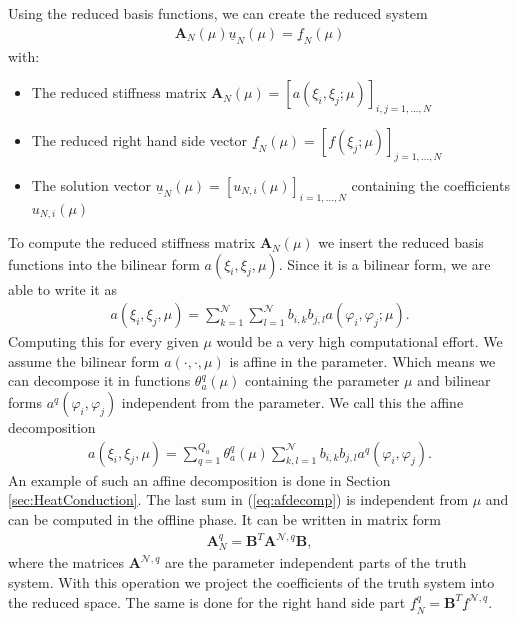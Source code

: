 Using the reduced basis functions, we can create the reduced system
\begin{align*}
\mathbf{A}_N (\mu) \underline{u}_N (\mu) = \underline{f}_N(\mu)
\end{align*}
with:
\begin{itemize}
	\item The reduced stiffness matrix $\mathbf{A}_N (\mu) = [a( \xi_i , \xi_j  ; \mu )]_{i,j=1,...,N}$
	\item The reduced right hand side vector $\underline{f}_N (\mu) = [f(\xi_j ; \mu)]_{j=1,...,N}$
	\item The solution vector $\underline{u}_N (\mu) = [ u_{N,i}(\mu) ]_{i=1,...,N}$ containing the coefficients $u_{N,i}(\mu)$
\end{itemize}
To compute the reduced stiffness matrix $\mathbf{A}_N (\mu)$ we insert the reduced basis functions into the bilinear form $a( \xi_i , \xi_j,  \mu )$.  
Since it is a bilinear form, we are able to write it as
\begin{align*}
a( \xi_i , \xi_j,  \mu ) =
\sum_{k=1}^{\mathcal{ N }} \sum_{l=1}^{\mathcal{ N }} b_{i,k} b_{j,l} a( \varphi_i , \varphi_j ;  \mu ).
\end{align*}
Computing this for every given $\mu$ would be a very high computational effort.
We assume the bilinear form $a(\cdot, \cdot, \mu)$ is affine in the parameter. Which means we can decompose it in functions $\theta_a^q(\mu)$ containing the parameter $\mu$ and bilinear forms $a^q( \varphi_i , \varphi_j )$ independent from the parameter.
We call this the affine decomposition 
\begin{align}
\label{eq:afdecomp}
a( \xi_i , \xi_j,  \mu ) =
\sum_{q=1}^{Q_a} \theta_a^q(\mu) \sum_{k,l=1}^{\mathcal{ N }} b_{i,k} b_{j,l} a^q( \varphi_i , \varphi_j ).
\end{align}
An example of such an affine decomposition is done in Section \ref{sec:HeatConduction}.
The last sum in (\ref{eq:afdecomp}) is independent from $\mu$ and can be computed in the offline phase. It can be written in matrix form
\begin{align*}
\mathbf{A}_N^q  = \mathbf{B}^T \mathbf{A}^{\mathcal{ N },q} \mathbf{B},
\end{align*}
where the matrices $\mathbf{A}^{\mathcal{ N },q}$ are the parameter independent parts of the truth system. With this operation we project the coefficients of the truth system into the reduced space.  
The same is done for the right hand side part $\underline{f}_N^q = \mathbf{B}^T  \underline{f}^{\mathcal{ N },q}$.


